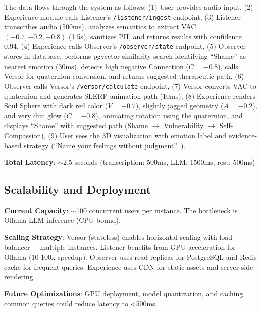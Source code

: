 The data flows through the system as follows: (1) User provides audio input, (2) Experience module calls Listener's \texttt{/listener/ingest} endpoint, (3) Listener transcribes audio (500ms), analyzes semantics to extract VAC = $(-0.7, -0.2, -0.8)$ (1.5s), sanitizes PII, and returns results with confidence 0.94, (4) Experience calls Observer's \texttt{/observer/state} endpoint, (5) Observer stores in database, performs pgvector similarity search identifying ``Shame'' as nearest emotion (30ms), detects high negative Connection ($C = -0.8$), calls Versor for quaternion conversion, and returns suggested therapeutic path, (6) Observer calls Versor's \texttt{/versor/calculate} endpoint, (7) Versor converts VAC to quaternion and generates SLERP animation path (10ms), (8) Experience renders Soul Sphere with dark red color ($V = -0.7$), slightly jagged geometry ($A = -0.2$), and very dim glow ($C = -0.8$), animating rotation using the quaternion, and displays ``Shame'' with suggested path (Shame $\rightarrow$ Vulnerability $\rightarrow$ Self-Compassion), (9) User sees the 3D visualization with emotion label and evidence-based strategy (``Name your feelings without judgment''~\cite{linehan2015}).

\textbf{Total Latency}: $\sim$2.5 seconds (transcription: 500ms, LLM: 1500ms, rest: 500ms)

\subsection{Scalability and Deployment}

\textbf{Current Capacity}: $\sim$100 concurrent users per instance. The bottleneck is Ollama LLM inference (CPU-bound).

\textbf{Scaling Strategy}: Versor (stateless) enables horizontal scaling with load balancer + multiple instances. Listener benefits from GPU acceleration for Ollama (10-100x speedup). Observer uses read replicas for PostgreSQL and Redis cache for frequent queries. Experience uses CDN for static assets and server-side rendering.

\textbf{Future Optimizations}: GPU deployment, model quantization, and caching common queries could reduce latency to <500ms.

